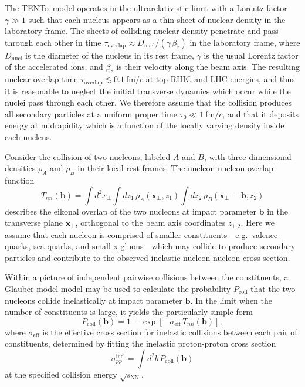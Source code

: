 \documentclass[aps,prc,reprint,amsmath,nofootinbib]{revtex4-1}
\newcommand{\trento}{T\raisebox{-0.5ex}{R}ENTo}
\newcommand{\sqrts}{\sqrt{s_\mathrm{NN}}}
\newcommand{\fmc}{\ensuremath{\text{fm}/c}}
\newcommand{\bv}{\mathbf b}
\newcommand{\xv}{\mathbf x}
\begin{document}
The \trento\ model operates in the ultrarelativistic limit with a Lorentz factor $\gamma \gg 1$ such that each nucleus appears as a thin sheet of nuclear density in the laboratory frame.
The sheets of colliding nuclear density penetrate and pass through each other in time $\tau_\text{overlap} \approx D_\text{nucl} / (\gamma\, \beta_z)$ in the laboratory frame, where $D_\text{nucl}$ is the diameter of the nucleus in its rest frame, $\gamma$ is the usual Lorentz factor of the accelerated ions, and $\beta_z$ is their velocity along the beam axis.
The resulting nuclear overlap time $\tau_\text{overlap} \lesssim 0.1\ \fmc$ at top RHIC and LHC energies, and thus it is reasonable to neglect the initial transverse dynamics which occur while the nuclei pass through each other.
We therefore assume that the collision produces all secondary particles at a uniform proper time $\tau_0 \ll 1~\fmc$, and that it deposits energy at midrapidity which is a function of the locally varying density inside each nucleus.

Consider the collision of two nucleons, labeled $A$ and $B$, with three-dimensional densities $\rho_A$ and $\rho_B$ in their local rest frames.
The nucleon-nucleon overlap function
\begin{equation}
  \label{eq:tpp}
  T_{nn}(\bv) = \int d^2x_\perp \int dz_1\, \rho_A(\xv_\perp, z_1) \int dz_2\, \rho_B(\xv_\perp - \,\bv, z_2)
\end{equation}
describes the eikonal overlap of the two nucleons at impact parameter $\bv$ in the transverse plane $\xv_\perp$, orthogonal to the beam axis coordinates $z_{1,2}$.
Here we assume that each nucleon is comprised of smaller constituents---e.g.\ valence quarks, sea quarks, and small-x gluons---which may collide to produce secondary particles and contribute to the observed inelastic nucleon-nucleon cross section.

Within a picture of independent pairwise collisions between the constituents, a Glauber model model may be used to calculate the probability $P_\mathrm{coll}$ that the two nucleons collide inelastically at impact parameter $\bv$.
In the limit when the number of constituents is large, it yields the particularly simple form
\begin{equation}
  \label{eq:pcoll}
  P_\mathrm{coll}(\bv) = 1 - \exp[-\sigma_\mathrm{eff}\, T_{nn}(\bv)],
\end{equation}
where $\sigma_\mathrm{eff}$ is the effective cross section for inelastic collisions between each pair of constituents, determined by fitting the inelastic proton-proton cross section
\begin{equation}
  \label{eq:sigma_nn}
  \sigma_{pp}^\mathrm{inel} = \int d^2b\, P_\mathrm{coll}(\bv)
\end{equation}
at the specified collision energy $\sqrts$.
\end{document}
